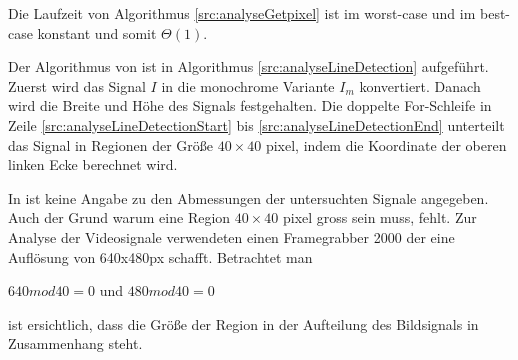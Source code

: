 

Die Laufzeit von Algorithmus \ref{src:analyseGetpixel} ist im worst-case und im best-case konstant und somit
 $\Theta(1)$.

Der Algorithmus von \citeauthor{clarke96} ist in Algorithmus \ref{src:analyseLineDetection} aufgeführt. Zuerst wird das
 Signal $I$ in die monochrome Variante $I_m$ konvertiert. Danach wird die Breite und Höhe des Signals festgehalten. Die
 doppelte For-Schleife in Zeile \ref{src:analyseLineDetectionStart} bis \ref{src:analyseLineDetectionEnd} unterteilt
 das Signal in Regionen der Größe $40 \times 40$ \gls{pixel}, indem die Koordinate der oberen linken Ecke berechnet
 wird.

In \citeauthor{clarke96} ist keine Angabe zu den Abmessungen der untersuchten Signale angegeben. Auch der Grund warum
 eine Region $40 \times 40$ \gls{pixel} gross sein muss, fehlt. Zur Analyse der Videosignale verwendeten
 \citeauthor{clarke96} einen Framegrabber 2000 der eine Auflösung von 640x480px schafft. Betrachtet man

$640 mod 40 = 0$ und $480 mod 40 = 0$

ist ersichtlich, dass die Größe der Region in der Aufteilung des Bildsignals in Zusammenhang steht.








